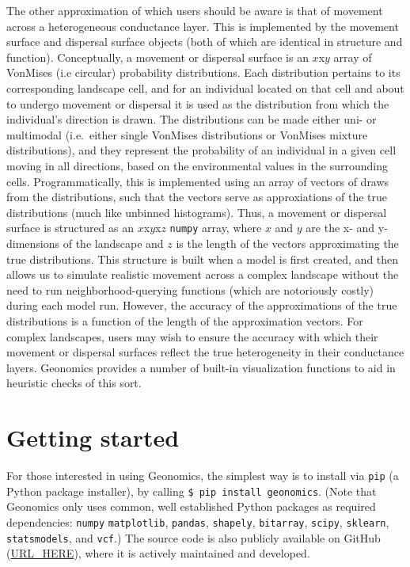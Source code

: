 ﻿\documentclass{article}
\begin{document}
The other approximation of which users should be aware
is that of movement across a heterogeneous conductance layer.
This is implemented by the movement surface and dispersal surface objects
(both of which are identical in structure and function).
Conceptually, a movement or dispersal surface is an $x$x$y$ array of VonMises (i.e circular)
probability distributions. Each distribution pertains to its corresponding landscape cell,
and for an individual located on that cell and about to undergo movement or dispersal
it is used as the distribution from which the individual's direction is drawn.
The distributions can be made either uni- or multimodal (i.e.\ either single VonMises distributions
or VonMises mixture distributions), and they represent the probability of an individual in a given
cell moving in all directions, based on the environmental values in the surrounding cells.
Programmatically, this is implemented using an array of vectors of draws from the distributions,
such that the vectors serve as approxiations of the true distributions (much like unbinned histograms).
Thus, a movement or dispersal surface is structured as an $x$x$y$x$z$ \texttt{numpy} array,
where $x$ and $y$ are the x- and y-dimensions of the landscape and $z$ is the length of the
vectors approximating the true distributions.
This structure is built when a model is first created, and then allows us to simulate realistic
movement across a complex landscape without the need to run neighborhood-querying functions
(which are notoriously costly) during each model run.
However, the accuracy of the approximations of the true distributions is a function of
the length of the approximation vectors.
For complex landscapes, users may wish to ensure the accuracy with which their movement or
dispersal surfaces reflect the true heterogeneity in their conductance layers.
Geonomics provides a number of built-in visualization functions to aid in heuristic checks of this sort.


\section{Getting started}
For those interested in using Geonomics, the simplest way is to install
via \texttt{pip} (a Python package installer),
by calling \texttt{\$ pip install geonomics}.
(Note that Geonomics only uses common, well established Python packages
as required dependencies: \texttt{numpy} \texttt{matplotlib},
\texttt{pandas}, \texttt{shapely}, \texttt{bitarray},
\texttt{scipy}, \texttt{sklearn}, \texttt{statsmodels}, and \texttt{vcf}.)
The source code is also publicly available on GitHub (\url{URL\_HERE}),
where it is actively maintained and developed.
\end{document}
